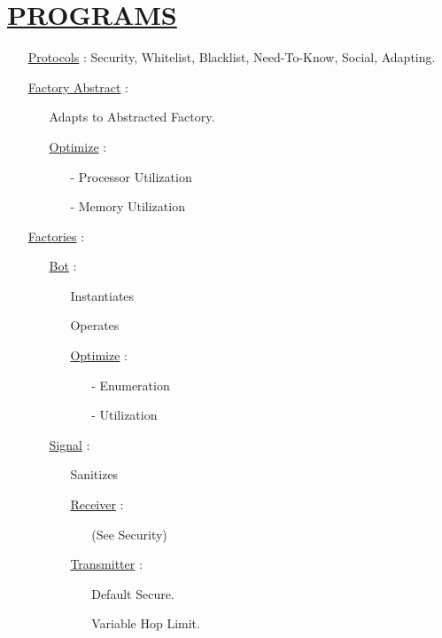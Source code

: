 \documentclass[11pt]{article}
\begin{document}
\section*{\ul{PROGRAMS}}
\begin{enumerate}
	\item[] \ul{Protocols} : Security, Whitelist, Blacklist, Need-To-Know, Social, Adapting.
	
	\item[] \ul{Factory Abstract} :
	\begin{enumerate}
		\item[] Adapts to Abstracted Factory.
		\item[] \ul{Optimize}  :
		\begin{enumerate}
			\item[-] Processor Utilization
			\item[-] Memory Utilization
		\end{enumerate}
	\end{enumerate}

	\item[] \ul{Factories} :
	\begin{enumerate}
		
		\item[] \ul{Bot} :
		\begin{enumerate}
			\item[] Instantiates
			\item[] Operates
			\item[] \ul{Optimize}  :
			\begin{enumerate}
				\item[-] Enumeration
				\item[-] Utilization
			\end{enumerate}
		\end{enumerate}

		\item[] \ul{Signal} :
		\begin{enumerate}
			\item[] Sanitizes
			
			\item[] \ul{Receiver}  :
			\begin{enumerate}
				\item[] (See Security)
			\end{enumerate}
			
			\item[] \ul{Transmitter}  :
			\begin{enumerate}
				\item[] Default Secure.
				\item[] Variable Hop Limit.
			\end{enumerate}
		

\end{enumerate}
\end{enumerate}
\end{enumerate}
\end{document}
